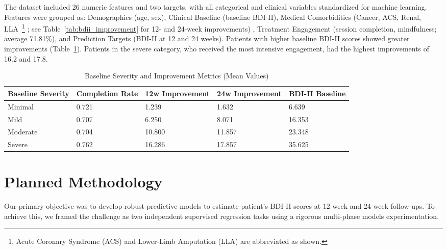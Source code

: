 \documentclass[conference]{IEEEtran}
\begin{document}
The dataset included 26 numeric features and two targets, with all categorical and clinical variables standardized for machine learning. Features were grouped as: Demographics (age, sex), Clinical Baseline (baseline BDI-II), Medical Comorbidities (Cancer, ACS, Renal, LLA~\footnote{Acute Coronary Syndrome (ACS) and Lower-Limb Amputation (LLA) are abbreviated as shown.} ; see Table~\ref{tab:bdii_improvement} for 12- and 24-week improvements) , Treatment Engagement (session completion, mindfulness; average 71.81\%), and Prediction Targets (BDI-II at 12 and 24 weeks). Patients with higher baseline BDI-II scores showed greater improvements (Table~\ref{tab:severity_metrics_mean}). Patients in the severe category, who received the most intensive engagement, had the highest improvements of 16.2 and 17.8.


\begin{table}
\centering
\caption{Baseline Severity and Improvement Metrics (Mean Values)}
\label{tab:severity_metrics_mean}
\begin{tabularx}{\linewidth}{|X|X|X|X|X|}
\hline
\textbf{Baseline Severity} & \textbf{Completion Rate} & \textbf{12w Improvement} & \textbf{24w Improvement} & \textbf{BDI-II Baseline} \\
\hline
Minimal & 0.721 & 1.239 & 1.632 & 6.639 \\ 
Mild & 0.707 & 6.250 & 8.071 & 16.353 \\ 
Moderate & 0.704 & 10.800 & 11.857 & 23.348 \\ 
Severe& 0.762 & 16.286 & 17.857 & 35.625 \\
\hline
\end{tabularx}
\end{table}




\section{Planned Methodology}

Our primary objective was to develop robust predictive models to estimate patient's BDI-II scores at 12-week and 24-week follow-ups. To achieve this, we framed the challenge as two independent supervised regression tasks using a rigorous multi-phase models experimentation.
\end{document}
